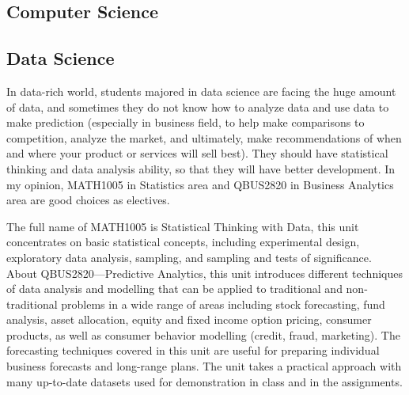 \documentclass[12pt]{article}
\begin{document}
\subsection{Computer Science}


\subsection{Data Science}

In data-rich world, students majored in data science are facing the huge amount of data, and sometimes they do not know how to analyze data and use data to make prediction (especially in business field, to help make comparisons to competition, analyze the market, and ultimately, make recommendations of when and where your product or services will sell best). They should have statistical thinking and data analysis ability, so that they will have better development. In my opinion, MATH1005 in Statistics area and QBUS2820 in Business Analytics area are good choices as electives.

The full name of MATH1005 is Statistical Thinking with Data, this unit concentrates on basic statistical concepts, including experimental design, exploratory data analysis, sampling, and sampling and tests of significance. About QBUS2820—Predictive Analytics, this unit introduces different techniques of data analysis and modelling that can be applied to traditional and non-traditional problems in a wide range of areas including stock forecasting, fund analysis, asset allocation, equity and fixed income option pricing, consumer products, as well as consumer behavior modelling (credit, fraud, marketing). The forecasting techniques covered in this unit are useful for preparing individual business forecasts and long-range plans. The unit takes a practical approach with many up-to-date datasets used for demonstration in class and in the assignments.
\end{document}
